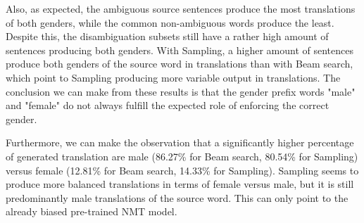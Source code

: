 Also, as expected, the ambiguous source sentences produce the most translations of both genders, while the common non-ambiguous words produce the least. Despite this, the disambiguation subsets still have a rather high amount of sentences producing both genders. With Sampling, a higher amount of sentences produce both genders of the source word in translations than with Beam search, which point to Sampling producing more variable output in translations. The conclusion we can make from these results is that the gender prefix words "male" and "female" do not always fulfill the expected role of enforcing the correct gender. 

Furthermore, we can make the observation that a significantly higher percentage of generated translation are male (86.27\% for Beam search, 80.54\% for Sampling) versus female (12.81\% for Beam search, 14.33\% for Sampling). Sampling seems to produce more balanced translations in terms of female versus male, but it is still predominantly male translations of the source word. This can only point to the already biased pre-trained NMT model. 

